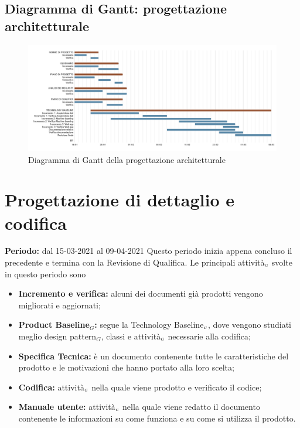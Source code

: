 \subsection{Diagramma di Gantt: progettazione architetturale}\label{PianificazioneDiagrammaDiGanttProgettazioneArchitetturale}
\begin{figure}[h]
	\begin{center}
		\includegraphics[width=0.9\linewidth]{../immagini/pdp/gantt_progettazione_architetturale.png}
		\caption{Diagramma di Gantt della progettazione architetturale}
	\end{center}
\end{figure}
\section{Progettazione di dettaglio e codifica}\label{PianificazioneProgettazioneDettaglio}
\textbf{Periodo:} dal 15-03-2021 al 09-04-2021
Questo periodo inizia appena concluso il precedente e termina con la Revisione di Qualifica.
Le principali attività$_{\scaleto{G}{3pt}}$ svolte in questo periodo sono
\begin{itemize}
	\item \textbf{Incremento e verifica:} alcuni dei documenti già prodotti vengono migliorati e aggiornati;
	\item \textbf{Product Baseline$_G$:} segue la Technology Baseline$_{\scaleto{G}{3pt}}$, dove vengono studiati meglio design pattern$_G$, classi e attività$_{\scaleto{G}{3pt}}$ necessarie alla codifica;
	\item \textbf{Specifica Tecnica:} è un documento contenente tutte le caratteristiche del prodotto e le motivazioni che hanno portato alla loro scelta;
	\item \textbf{Codifica:} attività$_{\scaleto{G}{3pt}}$ nella quale viene prodotto e verificato il codice;
	\item \textbf{Manuale utente:} attività$_{\scaleto{G}{3pt}}$ nella quale viene redatto il documento contenente le informazioni su come funziona e su come si utilizza il prodotto.
\end{itemize}
